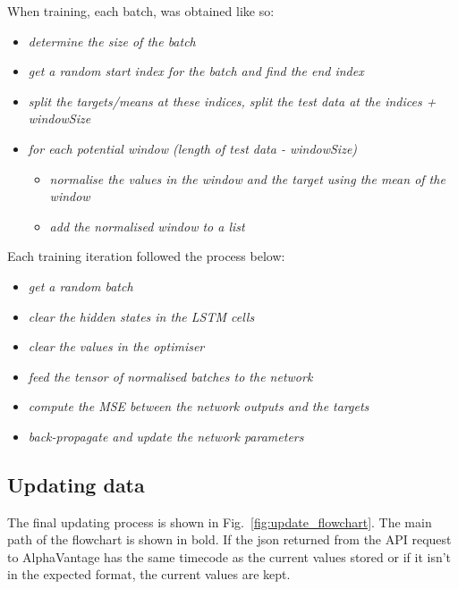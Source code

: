         \vspace{3mm}\linebreak
        When training, each batch, was obtained like so:
        \begin{itemize}
            \item \textit{determine the size of the batch}
            \item \textit{get a random start index for the batch and find the end index}
            \item \textit{split the targets/means at these indices, split the test data at the indices + windowSize}
            \item \textit{for each potential window (length of test data - windowSize)}
            \begin{itemize}
                \item \textit{normalise the values in the window and the target using the mean of the window}
                \item \textit{add the normalised window to a list}
            \end{itemize}
        \end{itemize}

        \vspace{3mm}\linebreak
        Each training iteration followed the process below:
        \begin{itemize}
            \item \textit{get a random batch}
            \item \textit{clear the hidden states in the LSTM cells}
            \item \textit{clear the values in the optimiser}
            \item \textit{feed the tensor of normalised batches to the network}
            \item \textit{compute the MSE between the network outputs and the targets}
            \item \textit{back-propagate and update the network parameters}
        \end{itemize}

        \pagebreak
        \subsection{Updating data}

            The final updating process is shown in Fig.~\ref{fig:update_flowchart}. The main path of the flowchart is shown in bold. If the json returned from the API request to AlphaVantage has the same timecode as the current values stored or if it isn't in the expected format, the current values are kept.
            
